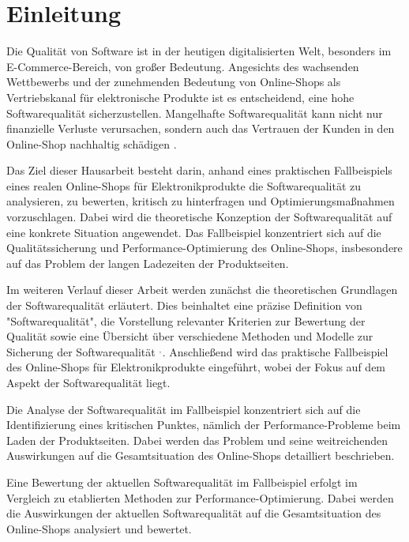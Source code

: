 \section{Einleitung}
Die Qualität von Software ist in der heutigen digitalisierten Welt, besonders im E-Commerce-Bereich, von großer Bedeutung. Angesichts des wachsenden Wettbewerbs und der zunehmenden Bedeutung von Online-Shops als Vertriebskanal für elektronische Produkte ist es entscheidend, eine hohe Softwarequalität sicherzustellen. Mangelhafte Softwarequalität kann nicht nur finanzielle Verluste verursachen, sondern auch das Vertrauen der Kunden in den Online-Shop nachhaltig schädigen .

Das Ziel dieser Hausarbeit besteht darin, anhand eines praktischen Fallbeispiels eines realen Online-Shops für Elektronikprodukte die Softwarequalität zu analysieren, zu bewerten, kritisch zu hinterfragen und Optimierungsmaßnahmen vorzuschlagen. Dabei wird die theoretische Konzeption der Softwarequalität auf eine konkrete Situation angewendet. Das Fallbeispiel konzentriert sich auf die Qualitätssicherung und Performance-Optimierung des Online-Shops, insbesondere auf das Problem der langen Ladezeiten der Produktseiten.

Im weiteren Verlauf dieser Arbeit werden zunächst die theoretischen Grundlagen der Softwarequalität erläutert. Dies beinhaltet eine präzise Definition von "Softwarequalität", die Vorstellung relevanter Kriterien zur Bewertung der Qualität sowie eine Übersicht über verschiedene Methoden und Modelle zur Sicherung der Softwarequalität $^{,\hspace{1pt}}$. Anschließend wird das praktische Fallbeispiel des Online-Shops für Elektronikprodukte eingeführt, wobei der Fokus auf dem Aspekt der Softwarequalität liegt.

Die Analyse der Softwarequalität im Fallbeispiel konzentriert sich auf die Identifizierung eines kritischen Punktes, nämlich der Performance-Probleme beim Laden der Produktseiten. Dabei werden das Problem und seine weitreichenden Auswirkungen auf die Gesamtsituation des Online-Shops detailliert beschrieben.

Eine Bewertung der aktuellen Softwarequalität im Fallbeispiel erfolgt im Vergleich zu etablierten Methoden zur Performance-Optimierung. Dabei werden die Auswirkungen der aktuellen Softwarequalität auf die Gesamtsituation des Online-Shops analysiert und bewertet.

